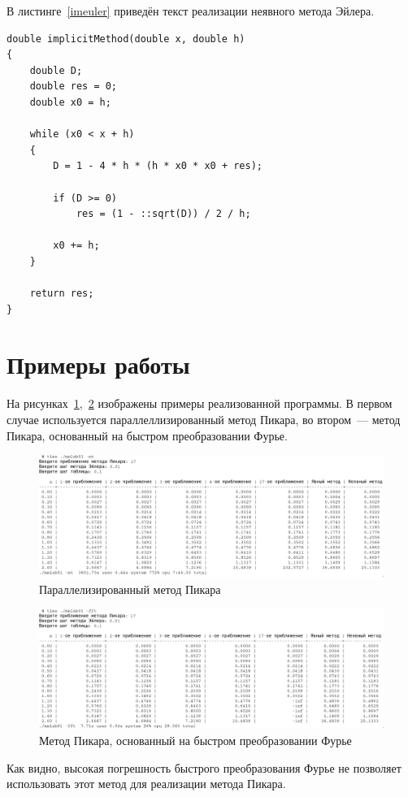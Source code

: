 В листинге~\ref{imeuler} приведён текст реализации неявного метода Эйлера.
\begin{lstlisting}[caption={Неявный метод Эйлера},label=imeuler]
double implicitMethod(double x, double h)
{
    double D;
    double res = 0;
    double x0 = h;

    while (x0 < x + h)
    {
        D = 1 - 4 * h * (h * x0 * x0 + res);

        if (D >= 0)
            res = (1 - ::sqrt(D)) / 2 / h;

        x0 += h;
    }

    return res;
}
\end{lstlisting}

\section{Примеры работы}
На рисунках~\ref{img:mtpicard},~\ref{img:fftpicard} изображены примеры реализованной программы. В первом случае используется параллеллизированный метод Пикара, во втором~--- метод Пикара, основанный на быстром преобразовании Фурье.
\begin{figure}[H]
    \caption{Параллелизированный метод Пикара}\label{img:mtpicard}
    \includegraphics[scale=0.27]{images/mtpicard.png}
\end{figure}
\begin{figure}[H]
    \caption{Метод Пикара, основанный на быстром преобразовании Фурье}\label{img:fftpicard}
    \includegraphics[scale=0.27]{images/fftpicard.png}
\end{figure}
Как видно, высокая погрешность быстрого преобразования Фурье не позволяет использовать этот метод для реализации метода Пикара.

